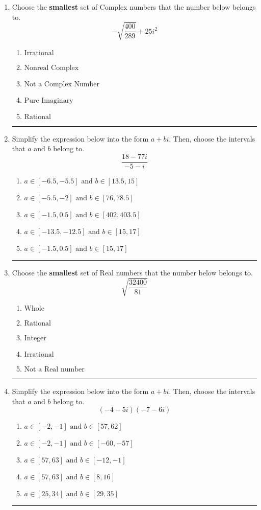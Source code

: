 \documentclass[14pt]{extbook}
\newcommand{\litem}[1]{\item#1\hspace*{-1cm}\rule{\textwidth}{0.4pt}}
\begin{document}
\begin{enumerate}
{\begin{enumerate}[label=\Alph*.]
\end{enumerate} }
\litem{
Choose the \textbf{smallest} set of Complex numbers that the number below belongs to.\[ -\sqrt{\frac{400}{289}} + 25i^2 \]\begin{enumerate}[label=\Alph*.]
\item \( \text{Irrational} \)
\item \( \text{Nonreal Complex} \)
\item \( \text{Not a Complex Number} \)
\item \( \text{Pure Imaginary} \)
\item \( \text{Rational} \)

\end{enumerate} }
\litem{
Simplify the expression below into the form $a+bi$. Then, choose the intervals that $a$ and $b$ belong to.\[ \frac{18 - 77 i}{-5 - i} \]\begin{enumerate}[label=\Alph*.]
\item \( a \in [-6.5, -5.5] \text{ and } b \in [13.5, 15] \)
\item \( a \in [-5.5, -2] \text{ and } b \in [76, 78.5] \)
\item \( a \in [-1.5, 0.5] \text{ and } b \in [402, 403.5] \)
\item \( a \in [-13.5, -12.5] \text{ and } b \in [15, 17] \)
\item \( a \in [-1.5, 0.5] \text{ and } b \in [15, 17] \)

\end{enumerate} }
\litem{
Choose the \textbf{smallest} set of Real numbers that the number below belongs to.\[ \sqrt{\frac{32400}{81}} \]\begin{enumerate}[label=\Alph*.]
\item \( \text{Whole} \)
\item \( \text{Rational} \)
\item \( \text{Integer} \)
\item \( \text{Irrational} \)
\item \( \text{Not a Real number} \)

\end{enumerate} }
\litem{
Simplify the expression below into the form $a+bi$. Then, choose the intervals that $a$ and $b$ belong to.\[ (-4 - 5 i)(-7 - 6 i) \]\begin{enumerate}[label=\Alph*.]
\item \( a \in [-2, -1] \text{ and } b \in [57, 62] \)
\item \( a \in [-2, -1] \text{ and } b \in [-60, -57] \)
\item \( a \in [57, 63] \text{ and } b \in [-12, -1] \)
\item \( a \in [57, 63] \text{ and } b \in [8, 16] \)
\item \( a \in [25, 34] \text{ and } b \in [29, 35] \)


\end{enumerate}}
\end{enumerate}
\end{document}
